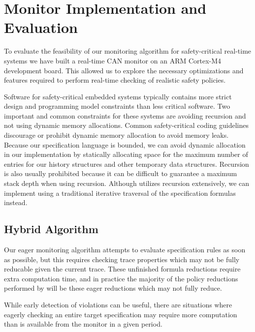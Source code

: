 
\section{Monitor Implementation and Evaluation}

To evaluate the feasibility of our monitoring algorithm for safety-critical real-time systems we have built a real-time CAN monitor on an ARM Cortex-M4 development board. This allowed us to explore the necessary optimizations and features required to perform real-time checking of realistic safety policies.


Software for safety-critical embedded systems typically contains more strict design and programming model constraints than less critical software. Two important and common constraints for these systems are avoiding recursion and not using dynamic memory allocations. 
Common safety-critical coding guidelines discourage or prohibit dynamic memory allocation to avoid memory leaks.
Because our specification language is bounded, we can avoid dynamic allocation in our \monitor implementation by statically allocating space for the maximum number of entries for our history structures and other temporary data structures.
Recursion is also usually prohibited because it can be difficult to guarantee a maximum stack depth when using recursion. Although \monitor utilizes recursion extensively, we can implement \monitor using a traditional iterative traversal of the specification formulas instead.

\subsection{Hybrid Algorithm}
Our eager monitoring algorithm attempts to evaluate specification rules as soon as possible, but this requires checking trace properties which may not be fully reducable given the current trace. These unfinished formula reductions require extra computation time, and in practice the majority of the policy reductions performed by \monitor will be these eager reductions which may not fully reduce.

While early detection of violations can be useful, there are situations where eagerly checking an entire target specification may require more computation than is available from the monitor in a given period.

